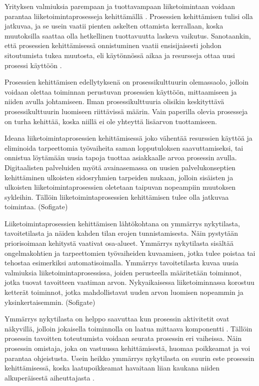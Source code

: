 \documentclass[finnish,12pt,a4paper,pdftex]{article}
\begin{document}
Yrityksen valmiuksia parempaan ja tuottavampaan liiketoimintaan voidaan parantaa liiketoimintaprosesseja kehittämällä \citep{teollisuustalous, leanit, ohjelmistotuotanto}. Prosessien kehittämisen tulisi olla jatkuvaa, ja se usein vaatii pienten askelten ottamista kerrallaan, koska muutoksilla saattaa olla hetkellinen tuottavuutta laskeva vaikutus. Sanotaankin, että prosessien kehittämisessä onnistuminen vaatii ensisijaisesti johdon sitoutumista tukea muutosta, eli käytönnössä aikaa ja resursseja ottaa uusi prosessi käyttöön \citep{okaytannot}.

Prosessien kehittämisen edellytyksenä on prosessikulttuurin olemassaolo, jolloin voidaan olettaa toiminnan perustuvan prosessien käyttöön, mittaamiseen ja niiden avulla johtamiseen. Ilman prosessikulttuuria olisikin keskityttävä prosessikulttuurin luomiseen riittävissä määrin. Vain paperilla olevia prosesseja on turha kehittää, koska niillä ei ole yhteyttä lisäarvon tuottamiseen. \citep{teollisuustalous}

Ideana liiketoimintaprosessien kehittämisessä joko vähentää resurssien käyttöä ja eliminoida tarpeettomia työvaiheita saman lopputuloksen saavuttamiseksi, tai onnistua löytämään uusia tapoja tuottaa asiakkaalle arvoa prosessin avulla. Digitaalisten palveluiden myötä avainasemassa on uusien palvelukonseptien kehittäminen ulkoisten sidosryhmien tarpeiden mukaan, jolloin sisäisten ja ulkoisten liiketoimintaprosessien oletetaan taipuvan nopeampiin muutoksen sykleihin. Tällöin liiketoimintaprosessien kehittämisen tulee olla jatkuvaa toimintaa. (Sofigate) 

Liiketoimintaprosessien kehittämisen lähtökohtana on ymmärrys nykytilasta, tavoitetilasta ja näiden kahden tilan erojen tunnistamisesta. Näin pystytään priorisoimaan kehitystä vaativat osa-alueet. Ymmärrys nykytilasta sisältää ongelmakohtien ja tarpeettomien työvaiheiden kuvaamisen, jotka tulee poistaa tai tehostaa esimerkiksi automatisoimalla. Ymmärrys tavoitetilasta kuvaa uusia valmiuksia liiketoimintaprosessissa, joiden perusteella määritetään toiminnot, jotka tuovat tavoitteen vaatiman arvon. Nykyaikaisessa liiketoiminnassa korostuu ketterät toiminnot, jotka mahdollistavat uuden arvon luomisen nopeammin ja yksinkertaisemmin. (Sofigate)

Ymmärrys nykytilasta on helppo saavuttaa kun prosessin aktivitetit ovat näkyvillä, jolloin jokaisella toiminnolla on laatua mittaava komponentti \citep{ohjelmistotuotanto}. Tällöin prosessin tavoitten toteutumista voidaan seurata prosessin eri vaiheissa. Näin prosessin omistaja, joka on vastuussa kehittämisestä, huomaa poikkeamat ja voi parantaa ohjeistusta. Usein heikko ymmärrys nykytilasta on suurin este prosessin kehittämisessä, koska laatupoikkeamat havaitaan liian kaukana niiden alkuperäisestä aiheuttajasta \citep{teollisuustalous}.
\end{document}
